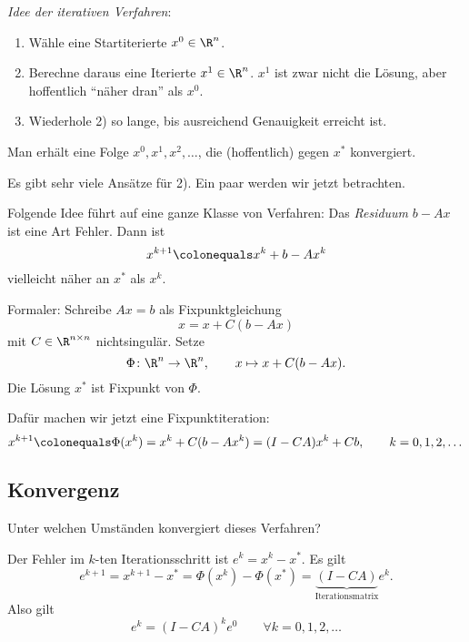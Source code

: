 \bigskip

\emph{Idee der iterativen Verfahren}:
\begin{enumerate}
	\item Wähle eine Startiterierte $x^0 \in \R^n$.
	\item Berechne daraus eine Iterierte $x^1 \in \R^n$. $x^1$ ist zwar nicht die Lösung,
	  aber hoffentlich "`näher dran"' als $x^0$.
	\item Wiederhole 2) so lange, bis ausreichend Genauigkeit erreicht ist.
\end{enumerate}
Man erhält eine Folge $x^0,x^1,x^2,\ldots$, die (hoffentlich) gegen $x^*$ konvergiert.

\bigskip

Es gibt sehr viele Ansätze für 2). Ein paar werden wir jetzt betrachten.

\bigskip

Folgende Idee führt auf eine ganze Klasse von Verfahren: Das \emph{Residuum} $b-Ax$ ist eine Art Fehler.
Dann ist
\begin{equation*}
	x^{k+1}\colonequals x^k+b-Ax^k
\end{equation*}
vielleicht näher an $x^*$ als $x^k$.

Formaler: Schreibe $Ax=b$ als Fixpunktgleichung
\begin{equation*}
	x=x+C(b-Ax)
\end{equation*}
mit $C \in \R^{n \times n}$ nichtsingulär. Setze
\begin{equation*}
 \Phi \colon \R^n \to \R^n, \qquad x \mapsto x+C(b-Ax).
\end{equation*}
Die Lösung $x^*$ ist Fixpunkt von $\Phi$.

Dafür machen wir jetzt eine Fixpunktiteration:
\begin{equation*}
  x^{k+1}\colonequals\Phi (x^k) = x^k+C (b-Ax^k)=(I-CA)x^k+Cb,
  \qquad
  k = 0, 1, 2, \dots
\end{equation*}

\subsection{Konvergenz}

Unter welchen Umständen konvergiert dieses Verfahren?

\medskip

Der Fehler im $k$-ten Iterationsschritt ist $e^k=x^k-x^*$. Es gilt
\begin{equation*}
 e^{k+1}=x^{k+1}-x^*
 =
 \Phi (x^k)-\Phi (x^* )=\underbrace{(I-CA)}_{\text{Iterationsmatrix}}e^k.
\end{equation*}
Also gilt
\begin{equation}
\label{equa:eqerrlin}
 e^k=(I-CA)^ke^0
 \qquad
 \forall k=0,1,2,\ldots
\end{equation}

